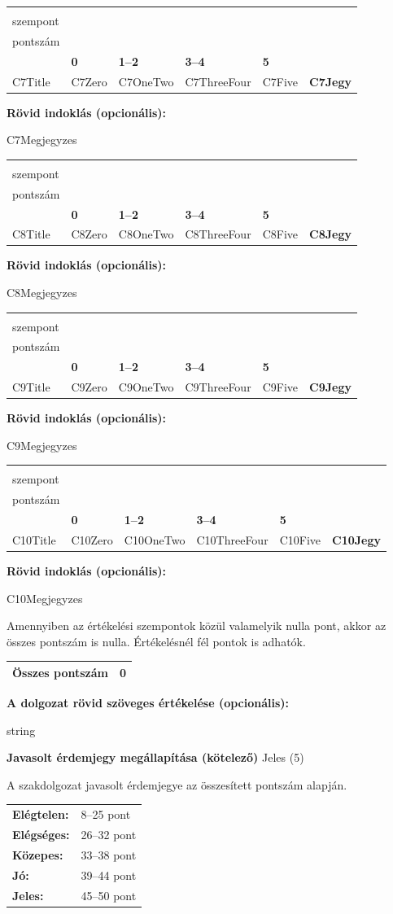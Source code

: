 \documentclass[a4paper,12pt]{article}
\newcommand{\EvaluationTable}[7]{

\renewcommand{\arraystretch}{1.35}

{\fontsize{9pt}{11pt}\selectfont

\begin{tabularx}{\textwidth}{|
>{\raggedright\arraybackslash}p{4.2cm}|
>{\centering\arraybackslash}X|
>{\centering\arraybackslash}X|
>{\centering\arraybackslash}X|
>{\centering\arraybackslash}X|
>{\centering\arraybackslash}p{1.8cm}|}

\hline

\multirow{2}{=}{\centering\textbf{Értékelési\\szempont}}
&
\multicolumn{4}{c|}{\textbf{Adható pontszám}}
&
\multirow{2}{=}{\centering\textbf{Elért\\pontszám}}
\\

\cline{2-5}

&
\textbf{0}
&
\textbf{1--2}
&
\textbf{3--4}
&
\textbf{5}
&
\\

\hline

#1
&
#2
&
#3
&
#4
&
#5
&
\textbf{#6}

\\
\hline

\end{tabularx}

\vspace{3mm}

\textbf{Rövid indoklás (opcionális):}

\vspace{2mm}

#7

\vspace{8mm}

}
}
\begin{document}
\EvaluationTable
{ {{C7Title}} }
{ {{C7Zero}} }
{ {{C7OneTwo}} }
{ {{C7ThreeFour}} }
{ {{C7Five}} }
{ {{C7Jegy}} }
{ {{C7Megjegyzes}} }

\EvaluationTable
{ {{C8Title}} }
{ {{C8Zero}} }
{ {{C8OneTwo}} }
{ {{C8ThreeFour}} }
{ {{C8Five}} }
{ {{C8Jegy}} }
{ {{C8Megjegyzes}} }

\EvaluationTable
{ {{C9Title}} }
{ {{C9Zero}} }
{ {{C9OneTwo}} }
{ {{C9ThreeFour}} }
{ {{C9Five}} }
{ {{C9Jegy}} }
{ {{C9Megjegyzes}} }

\EvaluationTable
{ {{C10Title}} }
{ {{C10Zero}} }
{ {{C10OneTwo}} }
{ {{C10ThreeFour}} }
{ {{C10Five}} }
{ {{C10Jegy}} }
{ {{C10Megjegyzes}} }

\bigskip

Amennyiben az értékelési szempontok közül valamelyik nulla pont, akkor az összes pontszám is nulla. Értékelésnél fél pontok is adhatók.

\bigskip

\begin{center}

\begin{tabular}{|l|c|}
\hline

\textbf{Összes pontszám} &
\textbf{0}

\\
\hline

\end{tabular}

\end{center}

\bigskip

\textbf{A dolgozat rövid szöveges értékelése (opcionális):}

\vspace{0.3cm}

string

\vspace{1cm}

\textbf{Javasolt érdemjegy megállapítása (kötelező)} Jeles (5)

\vspace{0.3cm}

A szakdolgozat javasolt érdemjegye az összesített pontszám alapján.

\bigskip

\begin{tabular}{ll}

\textbf{Elégtelen:} & 8--25 pont \\

\textbf{Elégséges:} & 26--32 pont \\

\textbf{Közepes:} & 33--38 pont \\

\textbf{Jó:} & 39--44 pont \\

\textbf{Jeles:} & 45--50 pont \\

\end{tabular}
\end{document}
